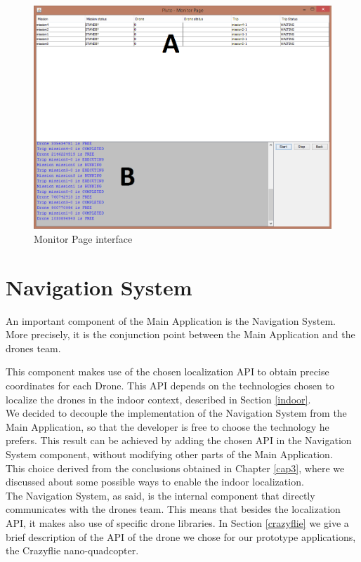 \begin{figure}[H]
  \centering
  \includegraphics[width=\linewidth]{pictures/MonitorPage.png}
  \caption{Monitor Page interface}
  \label{fig:MonitorPage}
\end{figure}

\section{Navigation System}\label{navigationSystem}

An important component of the Main Application is the Navigation System.
More precisely, it is the conjunction point between the Main Application and the drones team. 

This component makes use of the chosen localization API to obtain precise coordinates for each Drone.
This API depends on the technologies chosen to localize the drones in the indoor context, described in Section \ref{indoor}.
\\ 

We decided to decouple the implementation of the Navigation System from the Main Application, so that the developer is free to choose the technology he prefers.
This result can be achieved by adding the chosen API in the Navigation System component, without modifying other parts of the Main Application.
\\
This choice derived from the conclusions obtained in Chapter \ref{cap3}, where we discussed about some possible ways to enable the indoor localization.
\\
The Navigation System, as said, is the internal component that directly communicates with the drones team. 
This means that besides the localization API, it makes also use of specific drone libraries.
In Section \ref{crazyflie} we give a brief description of the API of the drone we chose for our prototype applications, the Crazyflie nano-quadcopter.
\\


